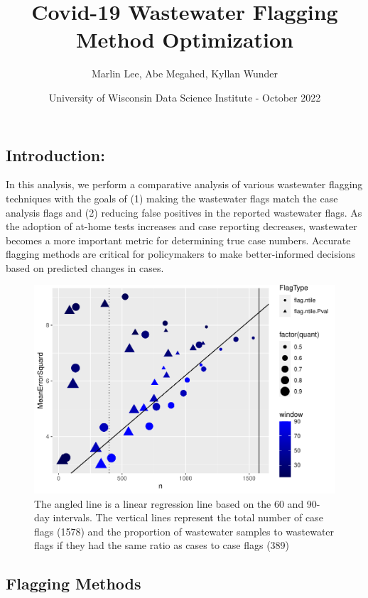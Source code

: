 \documentclass[
]{article}
\title{Covid-19 Wastewater Flagging Method Optimization}
\author{Marlin Lee, Abe Megahed, Kyllan Wunder \and University of
Wisconsin Data Science Institute - October 2022}
\date{}
\begin{document}
\maketitle

\hypertarget{introduction}{%
\subsection{Introduction:}\label{introduction}}

In this analysis, we perform a comparative analysis of various
wastewater flagging techniques with the goals of (1) making the
wastewater flags match the case analysis flags and (2) reducing false
positives in the reported wastewater flags. As the adoption of at-home
tests increases and case reporting decreases, wastewater becomes a more
important metric for determining true case numbers. Accurate flagging
methods are critical for policymakers to make better-informed decisions
based on predicted changes in cases.

\noindent

\begin{figure}
\includegraphics{optimising_flagging_method_files/figure-latex/unnamed-chunk-2-1} \caption{The angled line is a linear regression line based on the 60 and 90-day intervals. The vertical lines represent the total number of case flags (1578) and the proportion of wastewater samples to wastewater flags if they had the same ratio as cases to case flags (389)}\label{fig:unnamed-chunk-2}
\end{figure}

\hypertarget{flagging-methods}{%
\subsection{Flagging Methods}\label{flagging-methods}}
\end{document}

